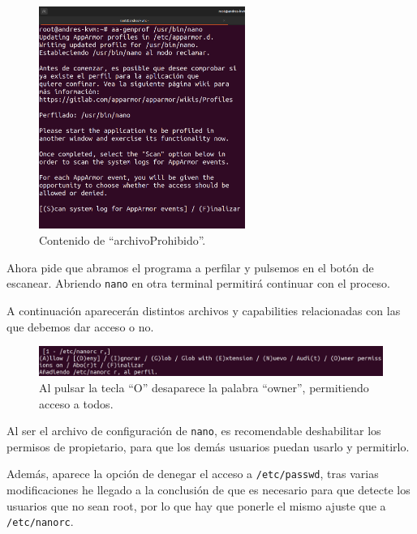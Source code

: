 \documentclass{article}
\begin{document}
\begin{figure}[H]
    \centering
    \includegraphics[width=0.6\textwidth]{imagenes/Captura desde 2022-10-18 16-41-31.png}
    \caption{Contenido de ``archivoProhibido''.}
\end{figure}

Ahora pide que abramos el programa a perfilar y pulsemos en el botón de escanear. Abriendo \verb|nano| en otra terminal permitirá continuar con el proceso.

\bigskip

A continuación aparecerán distintos archivos y capabilities relacionadas con las que debemos dar acceso o no.


\begin{figure}[H]
    \centering
    \includegraphics[width=\textwidth]{imagenes/Captura desde 2022-10-18 17-11-50.png}
    \caption{Al pulsar la tecla ``O'' desaparece la palabra ``owner'', permitiendo acceso a todos.}
\end{figure}

Al ser el archivo de configuración de \verb|nano|, es recomendable deshabilitar los permisos de propietario, para que los demás usuarios puedan usarlo y permitirlo.

\bigskip

Además, aparece la opción de denegar el acceso a \verb|/etc/passwd|, tras varias modificaciones he llegado a la conclusión de que es necesario para que detecte los usuarios que no sean root, por lo que hay que ponerle el mismo ajuste que a \verb|/etc/nanorc|.
\end{document}
